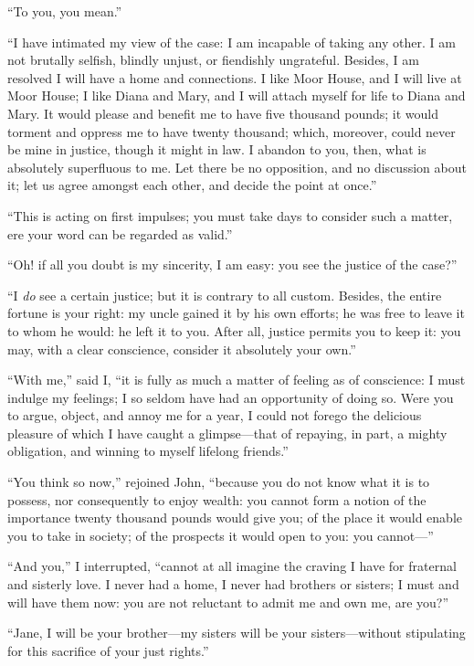 \enquote{To you, you mean.}

\enquote{I have intimated my view of the case: I am incapable of taking
any other. I am not brutally selfish, blindly unjust, or fiendishly
ungrateful. Besides, I am resolved I will have a home and connections. 
I like Moor House, and I will live at Moor House; I like Diana and Mary,
and I will attach myself for life to Diana and Mary. It would please
and benefit me to have five thousand pounds; it would torment and
oppress me to have twenty thousand; which, moreover, could never be mine
in justice, though it might in law. I abandon to you, then, what is
absolutely superfluous to me. Let there be no opposition, and no
discussion about it; let us agree amongst each other, and decide the
point at once.}

\enquote{This is acting on first impulses; you must take days to
consider such a matter, ere your word can be regarded as valid.}

\enquote{Oh! if all you doubt is my sincerity, I am easy: you see the
justice of the case?}

\enquote{I \emph{do} see a certain justice; but it is contrary to all custom. 
Besides, the entire fortune is your right: my uncle gained it by his own
efforts; he was free to leave it to whom he would: he left it to you. 
After all, justice permits you to keep it: you may, with a clear
conscience, consider it absolutely your own.}

\enquote{With me,} said I, \enquote{it is fully as much a matter of
feeling as of conscience: I must indulge my feelings; I so seldom have
had an opportunity of doing so. Were you to argue, object, and annoy me
for a year, I could not forego the delicious pleasure of which I have
caught a glimpse---that of repaying, in part, a mighty obligation, and
winning to myself lifelong friends.}

\enquote{You think so now,} rejoined \St{} John, \enquote{because you do
not know what it is to possess, nor consequently to enjoy wealth: you
cannot form a notion of the importance twenty thousand pounds would give
you; of the place it would enable you to take in society; of the
prospects it would open to you: you cannot---}

\enquote{And you,} I interrupted, \enquote{cannot at all imagine the
craving I have for fraternal and sisterly love. I never had a home, I
never had brothers or sisters; I must and will have them now: you are
not reluctant to admit me and own me, are you?}

\enquote{Jane, I will be your brother---my sisters will be your
sisters---without stipulating for this sacrifice of your just rights.}

